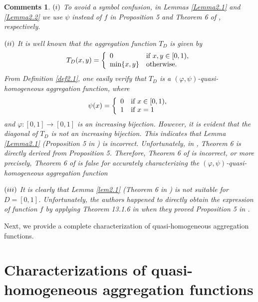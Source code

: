 \documentclass[12pt]{article}
\newtheorem{comments}{\bf Comments}[section]
\begin{document}
\begin{comments}\label{Remark 2.1}
\emph{$(\romannumeral 1)$ To avoid a symbol confusion, in Lemmas \ref{Lemma2.1} and \ref{Lemma2.2} we use $\psi$ instead of $f$ in Proposition 5 and Theorem 6 of \cite{Su2022}, respectively.}

\emph{$(\romannumeral 2)$ It is well known that the aggregation function $T_{D}$ is given by
\begin{equation*}
T_{D}(x,y)=\left\{\begin{array}{ll}
0 & {\mbox{\scriptsize\normalsize if  } x,y \in[0, 1)},\\
{\mbox{min}\{x,y\}} & {\mbox{\scriptsize\normalsize otherwise}.}
\end{array}
\right.
\end{equation*} From Definition \ref {def2.1}, one easily verify that $T_{D}$ is a $(\varphi, \psi)$-quasi-homogeneous aggregation function, where  $$\psi(x)=\left\{\begin{array}{ll}
0 & {\mbox{\scriptsize\normalsize if } x\in[0, 1),}\\
1 & {\mbox{\scriptsize\normalsize if } x=1}
\end{array}
\right.$$
and $\varphi:[0, 1] \rightarrow[0, 1]$ is an increasing bijection. However, it is evident that the diagonal of $T_{D}$ is not an increasing bijection.
This indicates that Lemma \ref{Lemma2.1} (Proposition 5 in \cite{Su2022}) is incorrect. Unfortunately, in \cite{Su2022}, Theorem 6 is directly derived from Proposition 5. Therefore, Theorem 6 of \cite{Su2022} is incorrect, or more precisely, Theorem 6 of \cite{Su2022} is false for accurately characterizing the $(\varphi, \psi)$-quasi-homogeneous aggregation function}

\emph{$(\romannumeral 3)$ It is clearly that Lemma \ref{lem2.1} (Theorem 6 in \cite{Su2022}) is not suitable for $D=[0,1]$. Unfortunately, the authors happened to directly obtain the expression of function $f$ by applying Theorem 13.1.6 in \cite{Kuczma1985} when they proved Proposition 5 in \cite{Su2022}.}
\end{comments}

Next, we provide a complete characterization of quasi-homogeneous aggregation functions.

\section{Characterizations of quasi-homogeneous aggregation functions}
\end{document}
